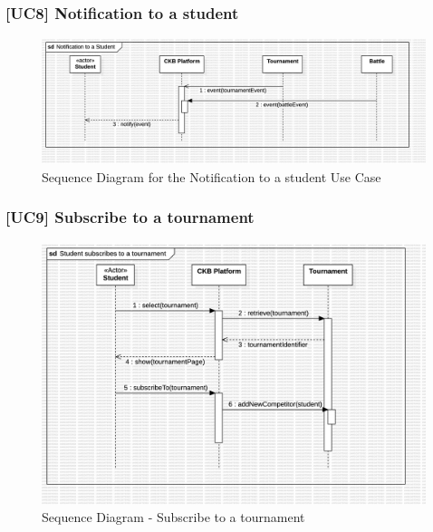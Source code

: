 \subsubsection*{[UC8] Notification to a student}
\begin{figure}[H]
    \centering
    \includegraphics[width=\textwidth]{Diagrams/UC8SequenceDiagram.jpg}
    \caption{Sequence Diagram for the Notification to a student Use Case}
    \label{fig:sequence-diagram-notification}
\end{figure}

\subsubsection*{[UC9] Subscribe to a tournament}
\begin{figure}[H]
    \centering
    \includegraphics[width=\textwidth]{Diagrams/StudentSubscription.jpg}
    \caption{Sequence Diagram - Subscribe to a tournament}
    \label{fig:sequence-diagram-subscribe-tournament}
\end{figure}
